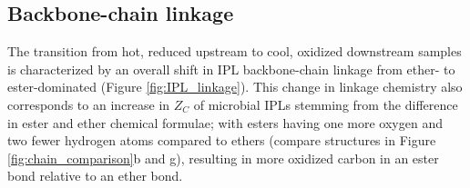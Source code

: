 


\subsection{Backbone-chain linkage} The transition from hot, reduced upstream to cool, oxidized downstream samples is characterized by an overall shift in IPL backbone-chain linkage from ether- to ester-dominated (Figure \ref{fig:IPL_linkage}). This change in linkage chemistry also corresponds to an increase in $Z_{C}$ of microbial IPLs stemming from the difference in ester and ether chemical formulae; with esters having one more oxygen and two fewer hydrogen atoms compared to ethers (compare structures in Figure \ref{fig:chain_comparison}b and g), resulting in more oxidized carbon in an ester bond relative to an ether bond.

